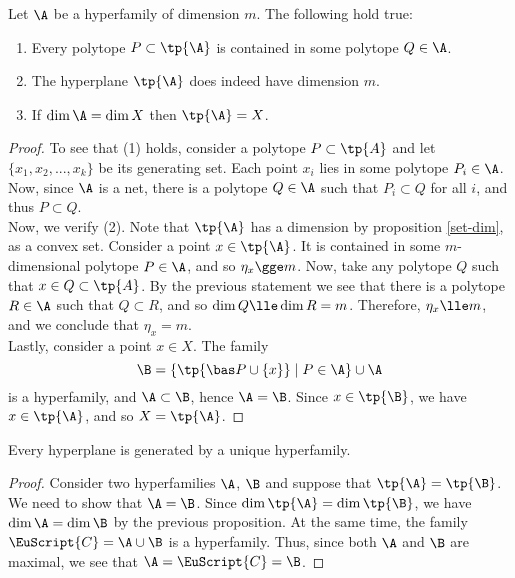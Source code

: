 \documentclass[12pt, a4paper]{article}
\newcommand{\C}{\EuScript{C}}
\begin{document}
\begin{proposition}\label{hyper-1}
    Let \(\A\) be a hyperfamily of dimension \(m\). The following hold true:
    
    \begin{enumerate}
        \item Every polytope \(P \subset \tp{\A}\) is contained in some polytope \(Q \in \A\).
        
        \item The hyperplane \(\tp{\A}\) does indeed have dimension \(m\).
        
        \item If \(\dim \A = \dim X\) then \(\tp{\A} = X\).
    \end{enumerate}
\end{proposition}
\begin{proof}
    To see that (1) holds, consider a polytope \(P \subset \tp{A}\) and let \(\{x_1, x_2, ..., x_k\}\) be its generating set. Each point \(x_i\) lies in some polytope \(P_i \in \A\). Now, since \(\A\) is a net, there is a polytope \(Q \in \A\) such that \(P_i \subset Q\) for all \(i\), and thus \(P \subset Q\).\\

    Now, we verify (2). Note that \(\tp{\A}\) has a dimension by proposition \ref{set-dim}, as a convex set. Consider a point \(x \in \tp{\A}\). It is contained in some \(m\)-dimensional polytope \(P \in \A\), and so \(\eta_x \gge m\). Now, take any polytope \(Q\) such that \(x \in Q \subset \tp{A}\). By the previous statement we see that there is a polytope \(R \in \A\) such that \(Q \subset R\), and so \(\dim Q \lle \dim R = m\). Therefore, \(\eta_x \lle m\), and we conclude that \(\eta_x = m\).\\

Lastly, consider a point \(x \in X\). The family \[\B = \{\tp{\bas P \cup \{x\}} \mid P \in \A\} \cup \A\] is a hyperfamily, and \(\A \subset \B\), hence \(\A = \B\). Since \(x \in \tp{\B}\), we have \(x \in \tp{\A}\), and so \(X = \tp{\A}\).
\end{proof}

\begin{theorem}\label{th-hyper-unique}
    Every hyperplane is generated by a unique hyperfamily.
\end{theorem}
\begin{proof}
    Consider two hyperfamilies \(\A\), \(\B\) and suppose that \(\tp{\A} = \tp{\B}\). We need to show that \(\A = \B\). Since \(\dim \tp{\A} = \dim \tp{\B}\), we have \(\dim \A = \dim \B\) by the previous proposition. At the same time, the family \(\C = \A \cup \B\) is a hyperfamily. Thus, since both \(\A\) and \(\B\) are maximal, we see that \(\A = \C = \B\).
\end{proof}
\end{document}
